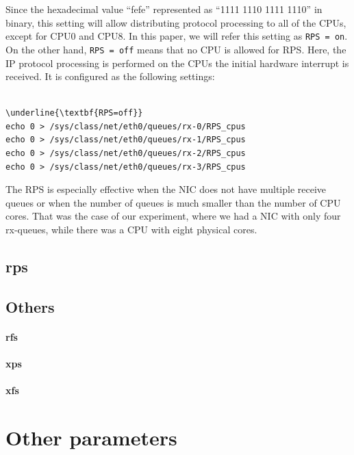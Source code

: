 Since the hexadecimal value \enquote{fefe} represented as \enquote{1111 1110 1111 1110} in binary, 
this setting will allow distributing protocol processing to all of the CPUs, except for CPU0 and CPU8.
In this paper, we will refer this setting as {\tt RPS = on}.
%
On the other hand, {\tt RPS = off} means that no CPU is allowed for RPS. 
Here, the IP protocol processing is performed on the CPUs the initial hardware interrupt is received.
It is configured as the following settings:

\begin{center}
\begin{minipage}{0.8\columnwidth}
\begin{Verbatim}[commandchars=\\\{\}]

\underline{\textbf{RPS=off}}
echo 0 > /sys/class/net/eth0/queues/rx-0/RPS_cpus
echo 0 > /sys/class/net/eth0/queues/rx-1/RPS_cpus
echo 0 > /sys/class/net/eth0/queues/rx-2/RPS_cpus
echo 0 > /sys/class/net/eth0/queues/rx-3/RPS_cpus

\end{Verbatim}
\end{minipage}
\end{center}

The RPS is especially effective when the NIC does not have multiple receive queues or when the number of queues is 
much smaller than the number of CPU cores. 
That was the case of our experiment, where we had a NIC with only four rx-queues, 
while there was a CPU with eight physical cores.

\subsection{rps}
\subsection{Others}
\paragraph{rfs}
\paragraph{xps}
\paragraph{xfs}

\section{Other parameters}
